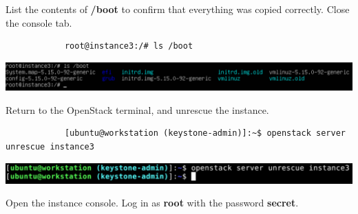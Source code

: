 \documentclass[letterpaper, 12pt]{article}
\begin{document}
\begin{enumerate}
    \begin{labstep}
        List the contents of \textbf{/boot} to confirm that everything was copied correctly.
        Close the console tab.
        \begin{lstlisting}
            root@instance3:/# ls /boot
        \end{lstlisting}

        \begin{center}
            \includegraphics[width=\linewidth]{images/part8/step14.png}
        \end{center}
    \end{labstep}

    \begin{labstep}
        Return to the OpenStack terminal, and unrescue the instance.
        \begin{lstlisting}
            [ubuntu@workstation (keystone-admin)]:~$ openstack server unrescue instance3
        \end{lstlisting}

        \begin{center}
            \includegraphics[width=\linewidth]{images/part8/step15.png}
        \end{center}
    \end{labstep}

    \begin{labstep}
        Open the instance console.
        Log in as \textbf{root} with the password \textbf{secret}.


\end{labstep}
\end{enumerate}
\end{document}
